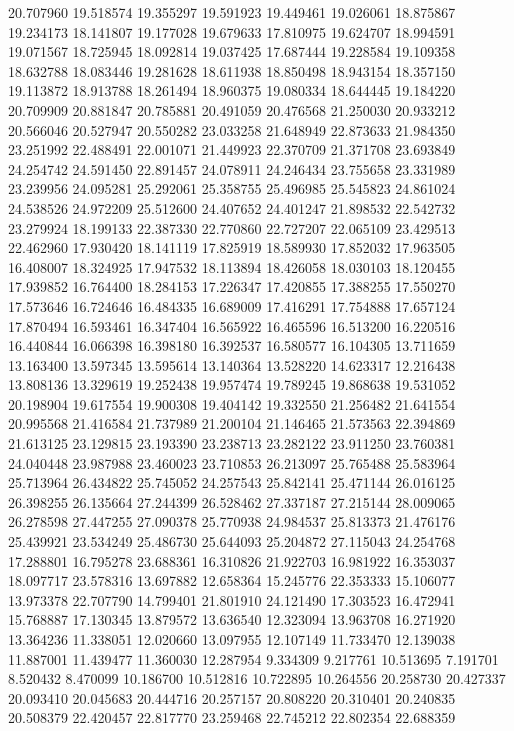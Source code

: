 20.707960
19.518574
19.355297
19.591923
19.449461
19.026061
18.875867
19.234173
18.141807
19.177028
19.679633
17.810975
19.624707
18.994591
19.071567
18.725945
18.092814
19.037425
17.687444
19.228584
19.109358
18.632788
18.083446
19.281628
18.611938
18.850498
18.943154
18.357150
19.113872
18.913788
18.261494
18.960375
19.080334
18.644445
19.184220
20.709909
20.881847
20.785881
20.491059
20.476568
21.250030
20.933212
20.566046
20.527947
20.550282
23.033258
21.648949
22.873633
21.984350
23.251992
22.488491
22.001071
21.449923
22.370709
21.371708
23.693849
24.254742
24.591450
22.891457
24.078911
24.246434
23.755658
23.331989
23.239956
24.095281
25.292061
25.358755
25.496985
25.545823
24.861024
24.538526
24.972209
25.512600
24.407652
24.401247
21.898532
22.542732
23.279924
18.199133
22.387330
22.770860
22.727207
22.065109
23.429513
22.462960
17.930420
18.141119
17.825919
18.589930
17.852032
17.963505
16.408007
18.324925
17.947532
18.113894
18.426058
18.030103
18.120455
17.939852
16.764400
18.284153
17.226347
17.420855
17.388255
17.550270
17.573646
16.724646
16.484335
16.689009
17.416291
17.754888
17.657124
17.870494
16.593461
16.347404
16.565922
16.465596
16.513200
16.220516
16.440844
16.066398
16.398180
16.392537
16.580577
16.104305
13.711659
13.163400
13.597345
13.595614
13.140364
13.528220
14.623317
12.216438
13.808136
13.329619
19.252438
19.957474
19.789245
19.868638
19.531052
20.198904
19.617554
19.900308
19.404142
19.332550
21.256482
21.641554
20.995568
21.416584
21.737989
21.200104
21.146465
21.573563
22.394869
21.613125
23.129815
23.193390
23.238713
23.282122
23.911250
23.760381
24.040448
23.987988
23.460023
23.710853
26.213097
25.765488
25.583964
25.713964
26.434822
25.745052
24.257543
25.842141
25.471144
26.016125
26.398255
26.135664
27.244399
26.528462
27.337187
27.215144
28.009065
26.278598
27.447255
27.090378
25.770938
24.984537
25.813373
21.476176
25.439921
23.534249
25.486730
25.644093
25.204872
27.115043
24.254768
17.288801
16.795278
23.688361
16.310826
21.922703
16.981922
16.353037
18.097717
23.578316
13.697882
12.658364
15.245776
22.353333
15.106077
13.973378
22.707790
14.799401
21.801910
24.121490
17.303523
16.472941
15.768887
17.130345
13.879572
13.636540
12.323094
13.963708
16.271920
13.364236
11.338051
12.020660
13.097955
12.107149
11.733470
12.139038
11.887001
11.439477
11.360030
12.287954
9.334309
9.217761
10.513695
7.191701
8.520432
8.470099
10.186700
10.512816
10.722895
10.264556
20.258730
20.427337
20.093410
20.045683
20.444716
20.257157
20.808220
20.310401
20.240835
20.508379
22.420457
22.817770
23.259468
22.745212
22.802354
22.688359
